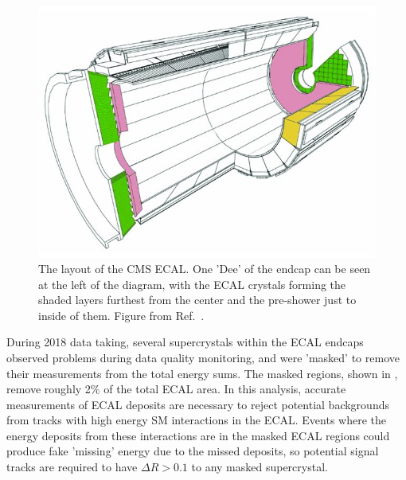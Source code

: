 \begin{figure}[htbp]
    \includegraphics[width=\textwidth]{figures/ecal_layout.jpg}
    \centering
	\caption[The CMS Electromagnetic Calorimeter]{The layout of the CMS ECAL. One 'Dee' of the endcap can be seen at the left of the diagram, with the ECAL crystals forming the shaded layers furthest from the center and the pre-shower just to inside of them. Figure from Ref.~\cite{cooke2022}.}
    \label{fig:ecalLayout}
\end{figure}

During 2018 data taking, several supercrystals within the ECAL endcaps observed problems during data quality monitoring, and were 'masked' to remove their measurements from the total energy sums.
The masked regions, shown in , remove roughly 2$\%$ of the total ECAL area.
In this analysis, accurate measurements of ECAL deposits are necessary to reject potential backgrounds from tracks with high energy SM interactions in the ECAL.
Events where the energy deposits from these interactions are in the masked ECAL regions could produce fake 'missing' energy due to the missed deposits, so potential signal tracks are required to have $\Delta R>0.1$ to any masked supercrystal.

